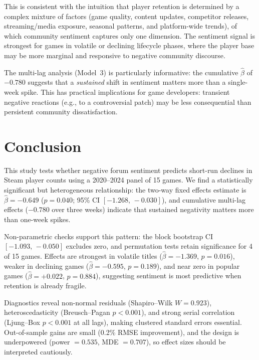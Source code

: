 \documentclass[11pt, letterpaper]{article}
\begin{document}
This is consistent with the intuition that player retention is determined by a complex mixture of factors (game quality, content updates, competitor releases, streaming/media exposure, seasonal patterns, and platform-wide trends), of which community sentiment captures only one dimension.
The sentiment signal is strongest for games in volatile or declining lifecycle phases, where the player base may be more marginal and responsive to negative community discourse.

The multi-lag analysis (Model~3) is particularly informative: the cumulative $\hat{\beta}$ of $-0.780$ suggests that a \emph{sustained} shift in sentiment matters more than a single-week spike.
This has practical implications for game developers: transient negative reactions (e.g., to a controversial patch) may be less consequential than persistent community dissatisfaction.

\section{Conclusion}\label{sec:conclusion}

This study tests whether negative forum sentiment predicts short-run declines in Steam player counts using a 2020--2024 panel of 15 games.
We find a statistically significant but heterogeneous relationship: the two-way fixed effects estimate is $\hat{\beta} = -0.649$ ($p = 0.040$; 95\% CI $[-1.268,\,-0.030]$), and cumulative multi-lag effects ($-0.780$ over three weeks) indicate that sustained negativity matters more than one-week spikes.

Non-parametric checks support this pattern: the block bootstrap CI $[-1.093,\,-0.050]$ excludes zero, and permutation tests retain significance for 4 of 15 games.
Effects are strongest in volatile titles ($\hat{\beta} = -1.369$, $p = 0.016$), weaker in declining games ($\hat{\beta} = -0.595$, $p = 0.189$), and near zero in popular games ($\hat{\beta} = +0.022$, $p = 0.884$), suggesting sentiment is most predictive when retention is already fragile.

Diagnostics reveal non-normal residuals (Shapiro--Wilk $W = 0.923$), heteroscedasticity (Breusch--Pagan $p < 0.001$), and strong serial correlation (Ljung--Box $p < 0.001$ at all lags), making clustered standard errors essential.
Out-of-sample gains are small (0.2\% RMSE improvement), and the design is underpowered (power $= 0.535$, MDE $= 0.707$), so effect sizes should be interpreted cautiously.
\end{document}
